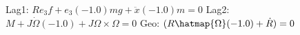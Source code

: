 
Lag1: $R e_3 f+e_3 (-1.0) m g+\ddot{x} (-1.0) m = 0$
Lag2: $M+J \dot{\Omega } (-1.0)+J \Omega \times \Omega  = 0$
Geo: $(R \hatmap{\Omega } (-1.0)+\dot{R}) = 0$